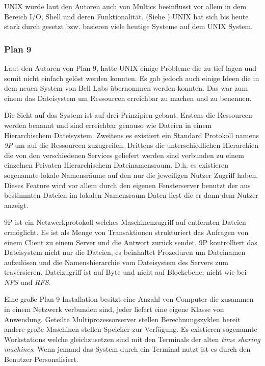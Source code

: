 \documentclass[11pt,technote]{IEEEtran}
\begin{document}
		    UNIX wurde laut den Autoren auch von Multics beeinflusst vor allem in dem Bereich I/O, Shell und deren Funktionalit\"at. (Siehe \cite[S. 374]{inproc:unix})
		    UNIX hat sich bis heute stark durch gesetzt bzw. basieren viele heutige Systeme auf dem UNIX System.
	    \subsubsection{Plan 9} \label{sec:secure:access:plan9}
        Laut den Autoren von Plan 9, hatte UNIX einige Probleme die zu tief lagen und somit nicht einfach gel\"ost werden konnten.
        Es gab jedoch auch einige Ideen die in dem neuen System von Bell Labs \"ubernommen werden konnten.
        Das war zum einem das Dateisystem um Ressourcen erreichbar zu machen und zu benennen.
    
        Die Sicht auf das System ist auf drei Prinzipien gebaut.
        Erstens die Ressourcen werden benannt und sind erreichbar genauso wie Dateien in einem Hierarchischem Dateisystem. 
        Zweitens es existiert ein Standard Protokoll namens \textit{9P} um auf die 
        Ressourcen zuzugreifen. Drittens die unterschiedlichen Hierarchien die von den verschiedenen Services geliefert
        werden sind verbunden zu einem einzelnen Privaten Hierarchischem Dateinamensraum. 
        D.h. es existieren sogenannte lokale Namensr\"aume auf den nur die jeweiligen Nutzer Zugriff haben.
        Dieses Feature wird vor allem durch den eigenen Fensterserver benutzt der aus bestimmten Dateien im lokalen 
        Namensraum Daten liest die er dann dem Nutzer anzeigt.
        
        9P ist ein Netzwerkprotokoll welches Maschinenzugriff auf entfernten Dateien erm\"oglicht.
        Es ist als Menge von Transaktionen strukturiert das Anfragen von einem Client zu einem Server und die Antwort zur\"uck sendet.
        9P kontrolliert das Dateisystem nicht nur die Dateien, es beinhaltet Prozeduren um Dateinamen aufzul\"osen und die Namenshierarchie
        vom Dateisystem des Servers zum traversieren.
        Dateizugriff ist auf Byte und nicht auf Blockebene, nicht wie bei \textit{NFS} und \textit{RFS}.
        
        Eine gro\ss e Plan 9 Installation besitzt eine Anzahl von Computer die zusammen in einem Netzwerk verbunden sind,
        jeder liefert eine eigene Klasse von Anwendung. Geteilte Multiprozessorserver stellen
        Berechnungszyklen bereit andere gro\ss e Maschinen stellen Speicher zur Verf\"ugung. Es existieren sogenannte Workstations welche gleichzusetzen sind mit den 
        Terminals der alten \textit{time sharing machines}. Wenn jemand das System durch ein Terminal nutzt ist es durch den Benutzer Personalisiert.
    
\end{document}
